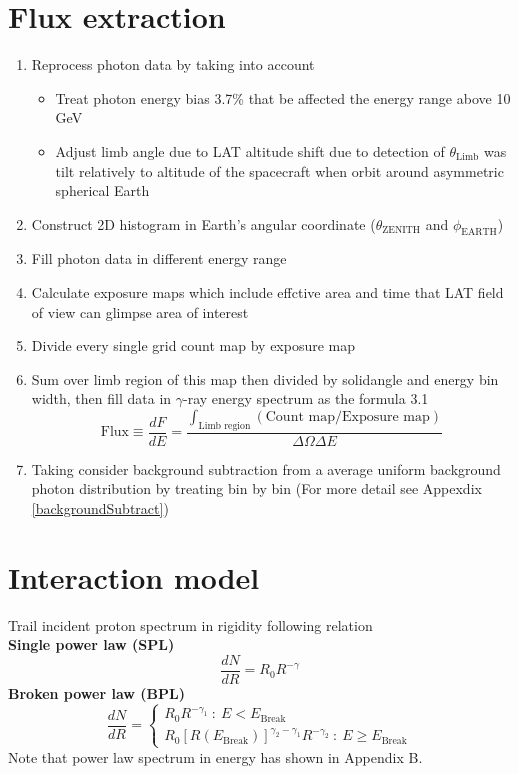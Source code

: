 \section{Flux extraction}
\begin{enumerate}
    \item Reprocess photon data by taking into account
        \begin{itemize}
            \item Treat photon energy bias 3.7\% that be affected the energy range above 10 GeV
            \item Adjust limb angle due to LAT altitude shift due to detection of $\theta_{\text{Limb}}$ was tilt relatively to altitude of the spacecraft when orbit around asymmetric spherical Earth 
        \end{itemize}
    \item Construct 2D histogram in Earth's angular coordinate ($\theta_{\text{ZENITH}}$ and $\phi_{\text{EARTH}}$)
    \item Fill photon data in different energy range
    \item Calculate exposure maps which include effctive area and time that LAT field of view can glimpse area of interest
    \item Divide every single grid count map by exposure map
    \item Sum over limb region of this map then divided by solidangle and energy bin width, then fill data in $\gamma$-ray energy spectrum as the formula 3.1
    \begin{equation}
        \text{Flux}\equiv\frac{dF}{dE} = \frac{\int_{\text{Limb region}} (\text{Count map}/\text{Exposure map})}{\Delta\Omega\Delta E}
    \end{equation}
    \item Taking consider background subtraction from a average uniform background photon distribution by treating bin by bin (For more detail see Appexdix \ref{backgroundSubtract})
\end{enumerate}




\section{Interaction model}
Trail incident proton spectrum in rigidity following relation \\
\textbf{Single power law (SPL)}
\begin{equation}
\frac{dN}{dR} = R_0R^{-\gamma}
\end{equation}
\textbf{Broken power law (BPL)}
\begin{equation}
\frac{dN}{dR}=
  \begin{cases}
    R_0R^{-\gamma_1}\ :\ E < E_{\text{Break}}\\
    R_0[R(E_{\text{Break}})]^{\gamma_2-\gamma_1}R^{-\gamma_2}\ :\ E \ge E_{\text{Break}}
  \end{cases}
\end{equation}
Note that power law spectrum in energy has shown in Appendix B.

